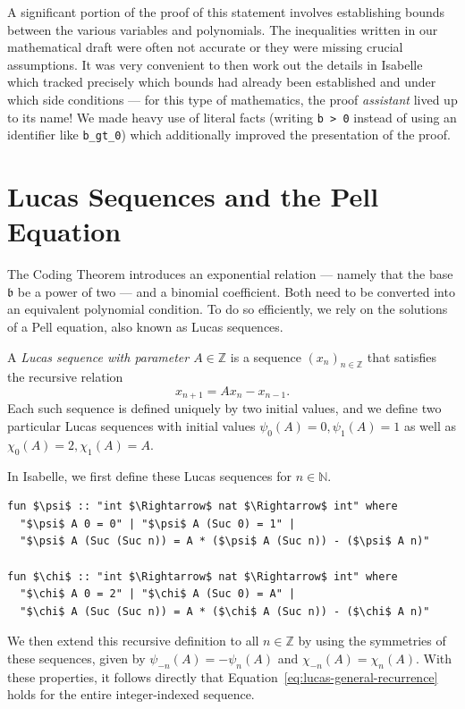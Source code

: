 \documentclass[a4paper,USenglish,cleveref,autoref,thm-restate]{lipics-v2021}
\newcommand{\N}{{\mathbb N}}
\newcommand{\Z}{{\mathbb Z}}
\newcommand{\bLowercase}{\mathfrak{b}}
\begin{document}
A significant portion of the proof of this statement involves establishing bounds between the various variables and polynomials. The inequalities written in our mathematical draft were often not accurate or they were missing crucial assumptions. It was very convenient to then work out the details in Isabelle which tracked precisely which bounds had already been established and under which side conditions --- for this type of mathematics, the proof \emph{assistant} lived up to its name! We made heavy use of literal facts (writing \texttt{\guilsinglleft b > 0\guilsinglright} instead of using an identifier like \texttt{b\_gt\_0}) which additionally improved the presentation of the proof. 

\section{Lucas Sequences and the Pell Equation}
The Coding Theorem introduces an exponential relation --- namely that the base $\bLowercase$ be a power of two --- and a binomial coefficient. Both need to be converted into an equivalent polynomial condition. To do so efficiently, we rely on the solutions of a Pell equation, also known as Lucas sequences. 

\begin{definition}
A \emph{Lucas sequence with parameter $A\in\Z$} is a sequence $(x_n)_{n\in \Z}$ that satisfies the recursive relation 
\begin{equation}\label{eq:lucas-general-recurrence}
    x_{n+1}=Ax_n-x_{n-1}.
\end{equation}
Each such sequence is defined uniquely by two initial values, and we define two particular Lucas sequences with initial values $\psi_0(A)=0, \psi_1(A)=1$ as well as $\chi_0(A)=2, \chi_1(A)=A$.
\end{definition}
In Isabelle, we first define these Lucas sequences for $n \in \N$.
\begin{lstlisting}
fun $\psi$ :: "int $\Rightarrow$ nat $\Rightarrow$ int" where
  "$\psi$ A 0 = 0" | "$\psi$ A (Suc 0) = 1" |
  "$\psi$ A (Suc (Suc n)) = A * ($\psi$ A (Suc n)) - ($\psi$ A n)"

fun $\chi$ :: "int $\Rightarrow$ nat $\Rightarrow$ int" where
  "$\chi$ A 0 = 2" | "$\chi$ A (Suc 0) = A" |
  "$\chi$ A (Suc (Suc n)) = A * ($\chi$ A (Suc n)) - ($\chi$ A n)"
\end{lstlisting}
We then extend this recursive definition to all $n \in \Z$ by using the symmetries of these sequences, given by $\psi_{-n}(A) = -\psi_n(A)$ and $\chi_{-n}(A) = \chi_n(A)$. With these properties, it follows directly that Equation~\eqref{eq:lucas-general-recurrence} holds for the entire integer-indexed sequence.
\end{document}
